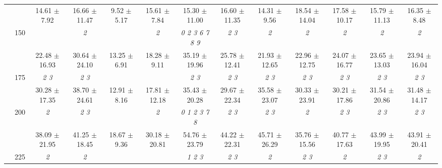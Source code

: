 \begin{table}[h]
{\begin{tabular}{
        ccccccccccccc}
 & & \cellcolor[HTML]{EFEFEF} 14.61 $\pm$ 7.92& \cellcolor[HTML]{EFEFEF} 16.66 $\pm$ 11.47& \cellcolor[HTML]{EFEFEF} 9.52 $\pm$ 5.17& \cellcolor[HTML]{EFEFEF} 15.61 $\pm$ 7.84& \cellcolor[HTML]{EFEFEF} 15.30 $\pm$ 11.00& \cellcolor[HTML]{EFEFEF} 16.60 $\pm$ 11.35& \cellcolor[HTML]{EFEFEF} 14.31 $\pm$ 9.56& \cellcolor[HTML]{EFEFEF} 18.54 $\pm$ 14.04& \cellcolor[HTML]{EFEFEF} 17.58 $\pm$ 10.17& \cellcolor[HTML]{EFEFEF} 15.79 $\pm$ 11.13& \cellcolor[HTML]{EFEFEF} 16.35 $\pm$ 8.48 \\ 
 & \multirow{2}{*}{150}& & \textit{ 2 }& & \textit{ 2 }& \textit{ 0 2 3 6 7 8 9 }& \textit{ 2 3 }& \textit{ 2 }& \textit{ 2 }& \textit{ 2 }& \textit{ 2 }& \textit{ 2 } \\ 
 & & 22.48 $\pm$ 16.93& 30.64 $\pm$ 24.10& 13.25 $\pm$ 6.91& 18.28 $\pm$ 9.11& 35.19 $\pm$ 19.96& 25.78 $\pm$ 12.41& 21.93 $\pm$ 12.65& 22.96 $\pm$ 12.75& 24.07 $\pm$ 16.77& 23.65 $\pm$ 13.03& 23.94 $\pm$ 16.04 \\ 
 & \multirow{2}{*}{175}& \cellcolor[HTML]{EFEFEF} \textit{ 2 3 }& \cellcolor[HTML]{EFEFEF} \textit{ 2 3 }& \cellcolor[HTML]{EFEFEF} & \cellcolor[HTML]{EFEFEF} & \cellcolor[HTML]{EFEFEF} \textit{ 2 3 }& \cellcolor[HTML]{EFEFEF} \textit{ 2 3 }& \cellcolor[HTML]{EFEFEF} \textit{ 2 3 }& \cellcolor[HTML]{EFEFEF} \textit{ 2 3 }& \cellcolor[HTML]{EFEFEF} \textit{ 2 3 }& \cellcolor[HTML]{EFEFEF} \textit{ 2 3 }& \cellcolor[HTML]{EFEFEF} \textit{ 2 3 } \\ 
 & & \cellcolor[HTML]{EFEFEF} 30.28 $\pm$ 17.35& \cellcolor[HTML]{EFEFEF} 38.70 $\pm$ 24.61& \cellcolor[HTML]{EFEFEF} 12.91 $\pm$ 8.16& \cellcolor[HTML]{EFEFEF} 17.81 $\pm$ 12.18& \cellcolor[HTML]{EFEFEF} 35.43 $\pm$ 20.28& \cellcolor[HTML]{EFEFEF} 29.67 $\pm$ 22.34& \cellcolor[HTML]{EFEFEF} 35.58 $\pm$ 23.07& \cellcolor[HTML]{EFEFEF} 30.33 $\pm$ 23.91& \cellcolor[HTML]{EFEFEF} 30.21 $\pm$ 17.86& \cellcolor[HTML]{EFEFEF} 31.54 $\pm$ 20.86& \cellcolor[HTML]{EFEFEF} 31.48 $\pm$ 14.17 \\ 
 & \multirow{2}{*}{200}& \textit{ 2 }& \textit{ 2 3 }& & \textit{ 2 }& \textit{ 0 1 2 3 7 8 }& \textit{ 2 3 }& \textit{ 2 3 }& \textit{ 2 }& \textit{ 2 3 }& \textit{ 2 3 }& \textit{ 2 3 } \\ 
 & & 38.09 $\pm$ 21.95& 41.25 $\pm$ 18.45& 18.67 $\pm$ 9.36& 30.18 $\pm$ 20.81& 54.76 $\pm$ 23.79& 44.22 $\pm$ 22.31& 45.71 $\pm$ 26.29& 35.76 $\pm$ 15.56& 40.77 $\pm$ 17.63& 43.99 $\pm$ 19.95& 43.91 $\pm$ 20.41 \\ 
 & \multirow{2}{*}{225}& \cellcolor[HTML]{EFEFEF} \textit{ 2 }& \cellcolor[HTML]{EFEFEF} \textit{ 2 }& \cellcolor[HTML]{EFEFEF} & \cellcolor[HTML]{EFEFEF} & \cellcolor[HTML]{EFEFEF} \textit{ 1 2 3 }& \cellcolor[HTML]{EFEFEF} \textit{ 2 3 }& \cellcolor[HTML]{EFEFEF} \textit{ 2 }& \cellcolor[HTML]{EFEFEF} \textit{ 2 3 }& \cellcolor[HTML]{EFEFEF} \textit{ 2 }& \cellcolor[HTML]{EFEFEF} \textit{ 2 3 }& \cellcolor[HTML]{EFEFEF} \textit{ 2 } \\ 

\end{tabular}}
\end{table}
